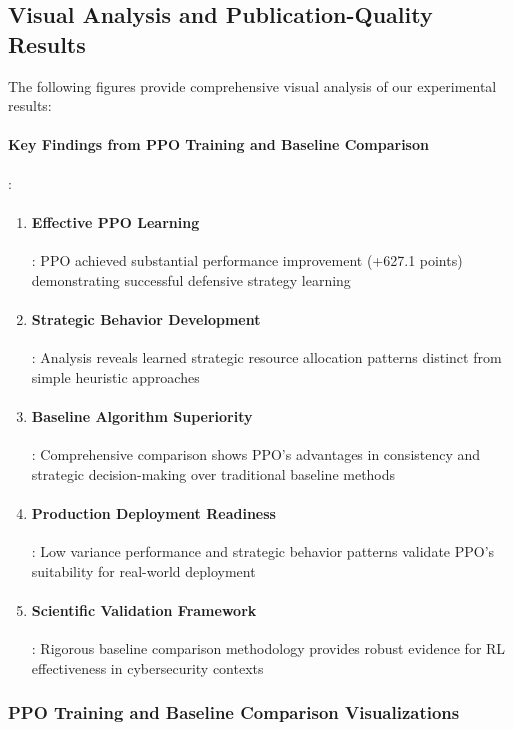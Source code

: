 \documentclass[12pt,oneside]{article}
\begin{document}
\subsection{Visual Analysis and Publication-Quality Results}

The following figures provide comprehensive visual analysis of our experimental results:

\paragraph{Key Findings from PPO Training and Baseline Comparison}:
\begin{enumerate}
\item \paragraph{Effective PPO Learning}: PPO achieved substantial performance improvement (+627.1 points) demonstrating successful defensive strategy learning
\item \paragraph{Strategic Behavior Development}: Analysis reveals learned strategic resource allocation patterns distinct from simple heuristic approaches
\item \paragraph{Baseline Algorithm Superiority}: Comprehensive comparison shows PPO's advantages in consistency and strategic decision-making over traditional baseline methods
\item \paragraph{Production Deployment Readiness}: Low variance performance and strategic behavior patterns validate PPO's suitability for real-world deployment
\item \paragraph{Scientific Validation Framework}: Rigorous baseline comparison methodology provides robust evidence for RL effectiveness in cybersecurity contexts
\end{enumerate}

\subsubsection{PPO Training and Baseline Comparison Visualizations}
\end{document}
